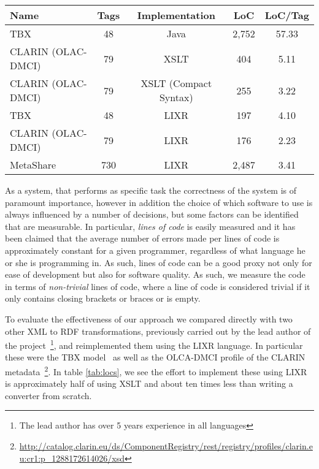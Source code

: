 \documentclass{acm_proc_article-sp}
\begin{document}
\begin{table*}
\begin{center}
\begin{tabular}{p{4cm}|cccc}
Name & Tags & Implementation & LoC & LoC/Tag \\
\hline
TBX & 48 & Java & 2,752 & 57.33 \\
CLARIN (OLAC-DMCI) & 79 & XSLT & 404 & 5.11 \\
CLARIN (OLAC-DMCI) & 79 & XSLT (Compact Syntax) & 255 & 3.22 \\
\hline
TBX & 48 & LIXR & 197 & 4.10 \\
CLARIN (OLAC-DMCI) & 79 & LIXR & 176 & 2.23 \\
MetaShare & 730 & LIXR & 2,487 & 3.41 \\
\end{tabular}
\end{center}
\caption{\label{tab:locs}Comparison of XML to RDF mapping implementations,
by number of tags in XML schema, and non-trivial lines of code (LoC)}
\end{table*}

As a system, that performs as specific task the correctness of the system is of 
paramount importance, however in addition the choice of which software to use
is always influenced by a number of decisions, but some factors can be identified
that are measurable. In particular, \emph{lines of code} is easily measured and it
has been claimed that the average number of errors made per lines of code is 
approximately constant for a given programmer, regardless of what language he or
she is programming in. As such, lines of code can be a good proxy not only for
ease of development but also for software quality. As such, we measure the
code in terms of \emph{non-trivial} lines of code, where a line of code
is considered trivial if it only contains closing brackets or braces or is empty.

To evaluate the effectiveness of our approach we compared directly with two other
XML to RDF transformations, previously carried out by the lead author of the
project~\footnote{The lead author has over 5 years experience in all languages}, and
reimplemented them using the LIXR language. In particular these were the TBX
model~\cite{iso30042} as well as the OLCA-DMCI profile of the CLARIN
metadata~\footnote{\url{http://catalog.clarin.eu/ds/ComponentRegistry/rest/registry/profiles/clarin.eu:cr1:p\_1288172614026/xsd}}. In table \ref{tab:locs}, we see the
effort to implement these using LIXR is approximately half of using XSLT and
about ten times less than writing a converter from scratch.
\end{document}
